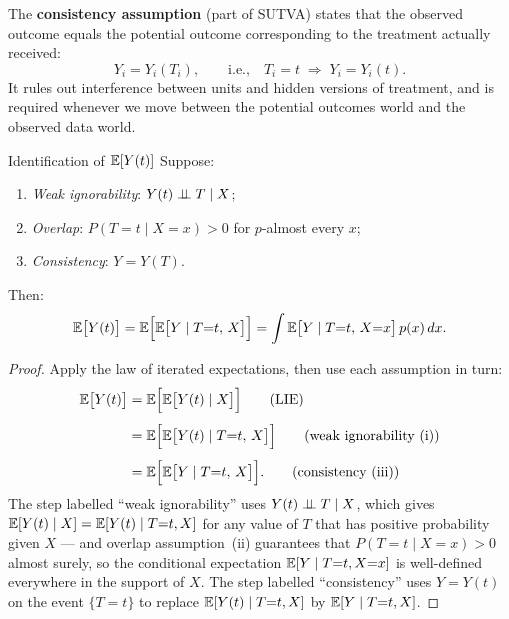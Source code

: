 \documentclass[master.tex]{subfiles}
\begin{document}
\begin{tcolorbox}[defstyle, title={Consistency Assumption}]
\label{w5:assump:sutva}
The \textbf{consistency assumption} (part of SUTVA) states that the
observed outcome equals the potential outcome corresponding to the
treatment actually received:
\[
  Y_i = Y_i(T_i), \qquad \text{i.e.,}\quad
  T_i = t \;\Rightarrow\; Y_i = Y_i(t).
\]
It rules out interference between units and hidden versions of
treatment, and is required whenever we move between the potential
outcomes world and the observed data world.
\end{tcolorbox}

\begin{lemma}{Identification of $\mathbb{E}[Y(t)]$}
\label{w5:prop:ident-pot}
Suppose:
\begin{enumerate}
  \item[(i)] \emph{Weak ignorability}: $Y(t) \perp\!\!\!\perp T \mid X$;
  \item[(ii)] \emph{Overlap}: $P(T{=}t \mid X{=}x) > 0$
    for $p$-almost every $x$;
  \item[(iii)] \emph{Consistency}: $Y = Y(T)$.
\end{enumerate}
Then:
\begin{equation}
  \mathbb{E}\bigl[Y(t)\bigr]
  = \mathbb{E}\Bigl[\mathbb{E}\bigl[Y \mid T{=}t,\, X\bigr]\Bigr]
  = \int \mathbb{E}\bigl[Y \mid T{=}t,\, X{=}x\bigr]\, p(x)\, dx.
  \label{w5:eq:ident-pot}
\end{equation}
\end{lemma}

\begin{proof}
Apply the law of iterated expectations, then use each assumption in
turn:
\begin{align}
  \mathbb{E}\bigl[Y(t)\bigr]
  &= \mathbb{E}\Bigl[\mathbb{E}\bigl[Y(t) \mid X\bigr]\Bigr]
  \tag{LIE} \\[4pt]
  &= \mathbb{E}\Bigl[\mathbb{E}\bigl[Y(t) \mid T{=}t,\, X\bigr]\Bigr]
  \tag{weak ignorability (i)} \\[4pt]
  &= \mathbb{E}\Bigl[\mathbb{E}\bigl[Y \mid T{=}t,\, X\bigr]\Bigr].
  \tag{consistency (iii)}
\end{align}
The step labelled ``weak ignorability'' uses $Y(t) \perp\!\!\!\perp T \mid X$,
which gives $\mathbb{E}[Y(t) \mid X] = \mathbb{E}[Y(t) \mid T{=}t, X]$ for any value
of $T$ that has positive probability given $X$ --- and overlap
assumption~(ii) guarantees that $P(T{=}t \mid X{=}x) > 0$ almost
surely, so the conditional expectation $\mathbb{E}[Y \mid T{=}t, X{=}x]$ is
well-defined everywhere in the support of $X$.  The step labelled
``consistency'' uses $Y = Y(t)$ on the event $\{T = t\}$ to replace
$\mathbb{E}[Y(t) \mid T{=}t, X]$ by $\mathbb{E}[Y \mid T{=}t, X]$.
\end{proof}
\end{document}
